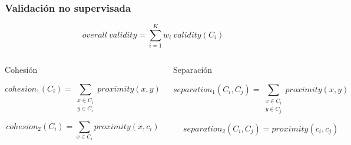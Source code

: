 \begin{frame}
    \frametitle{Validación no supervisada}

    \begin{equation*}
        overall\ validity = \sum_{i=1}^{K}{w_i\ validity(C_i)}
    \end{equation*}

    \begin{columns}

        \pause

        \begin{block}{Cohesión}

        {\footnotesize
        \begin{equation*}
            cohesion_1(C_i) = \sum_{\substack{x\in C_i \\ y\in C_i}}{proximity(x,y)}
        \end{equation*}
        }

        {\footnotesize
        \begin{equation*}
            cohesion_2(C_i) = \sum_{x\in C_i}{proximity(x,c_i)}
        \end{equation*}
        }

        \end{block}

        \pause

        \begin{block}{Separación}

        {\footnotesize
        \begin{equation*}
            separation_1(C_i, C_j) = \sum_{\substack{x\in C_i \\ y\in C_j}}{proximity(x,y)}
        \end{equation*}
        }

        {\footnotesize
        \begin{equation*}
            separation_2(C_i, C_j) = proximity(c_i,c_j)
        \end{equation*}
        }

        \end{block}
    \end{columns}

\end{frame}

